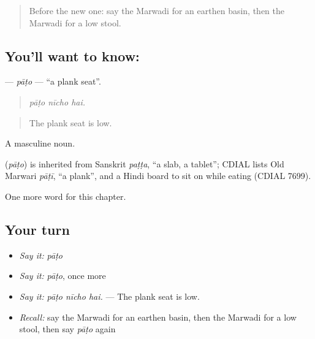 \label{lesson:MW-C186-pato}



\begin{quote}
Before the new one: say the Marwadi for an earthen basin, then the Marwadi for a low stool.
\end{quote}

\subsection*{You'll want to know: }
\textbf{} — \emph{pāṭo} — \textquotedblleft{}a plank seat\textquotedblright{}.

\begin{quote}
  
\end{quote}

\begin{quote}
\emph{pāṭo nīcho hai.}
\end{quote}

\begin{quote}
The plank seat is low.
\end{quote}

A masculine noun.

\begin{cousinweb}
\textbf{} (\emph{pāṭo}) is inherited from Sanskrit \emph{paṭṭa}, \textquotedblleft{}a slab, a tablet\textquotedblright{}; CDIAL lists Old Marwari \emph{pāṭī}, \textquotedblleft{}a plank\textquotedblright{}, and a Hindi board to sit on while eating (CDIAL 7699).
\end{cousinweb}

\begin{grammarlens}[title={What you've built}]
One more word for this chapter.
\end{grammarlens}

\subsection*{Your turn}
\begin{itemize}
\raggedright
  \item \emph{Say it:} \emph{pāṭo}
  \item \emph{Say it:} \emph{pāṭo}, once more
  \item \emph{Say it:} \emph{pāṭo nīcho hai.} — The plank seat is low.
  \item \emph{Recall:} say the Marwadi for an earthen basin, then the Marwadi for a low stool, then say \emph{pāṭo} again
\end{itemize}

